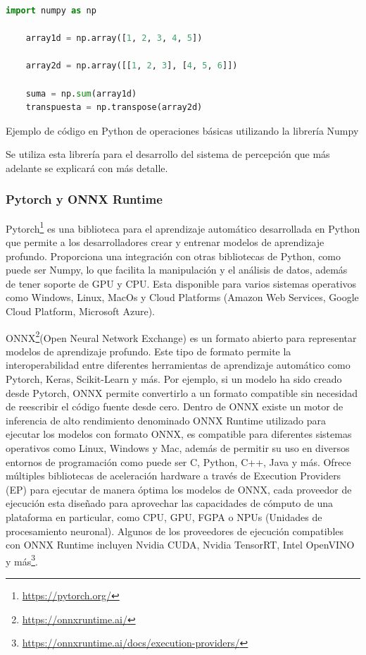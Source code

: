\begin{code}[h]
  \begin{lstlisting}[language=Python]
    import numpy as np

    array1d = np.array([1, 2, 3, 4, 5])

    array2d = np.array([[1, 2, 3], [4, 5, 6]])

    suma = np.sum(array1d)  
    transpuesta = np.transpose(array2d)  
  \end{lstlisting}
  \caption[Ejemplo de código en Python de operaciones básicas utilizando la librería Numpy]{Ejemplo de código en Python de operaciones básicas utilizando la librería Numpy}
  \label{cod:Numpy}
  \end{code}  

Se utiliza esta librería para el desarrollo del sistema de percepción que más adelante se explicará con más detalle. 

\subsubsection{Pytorch y ONNX Runtime}
\label{sec:pytorchandonnx}
Pytorch\footnote{\url{https://pytorch.org/}} es una biblioteca para el aprendizaje automático desarrollada en Python que permite a 
los desarrolladores crear y entrenar modelos de aprendizaje profundo. Proporciona una integración con otras bibliotecas de Python, como puede ser
Numpy, lo que facilita la manipulación y el análisis de datos, además de tener soporte de GPU y CPU. Esta disponible para varios sistemas operativos 
como Windows, Linux, MacOs y Cloud Platforms (Amazon Web Services, Google Cloud Platform, Microsoft Azure).

ONNX\footnote{\url{https://onnxruntime.ai/}}(Open Neural Network Exchange) es un formato abierto para representar modelos de aprendizaje profundo. Este tipo de formato 
permite la interoperabilidad entre diferentes herramientas de aprendizaje automático como Pytorch, Keras, Scikit-Learn y más. Por ejemplo, si un modelo ha sido creado desde Pytorch, 
ONNX permite convertirlo 
a un formato compatible sin necesidad de reescribir el código fuente desde cero. Dentro de ONNX existe un motor de inferencia de alto rendimiento denominado ONNX Runtime utilizado 
para ejecutar los modelos con formato ONNX, es compatible para diferentes sistemas operativos como Linux, Windows y Mac, además de permitir su uso en diversos entornos de programación
como puede ser C, Python, C++, Java y más. Ofrece múltiples bibliotecas de aceleración hardware a través de Execution Providers (EP) para ejecutar de manera óptima los modelos de ONNX, cada proveedor de ejecución
esta diseñado para aprovechar las capacidades de cómputo de una plataforma en particular, como CPU, GPU, FGPA o NPUs (Unidades de procesamiento neuronal).
Algunos de los proveedores de ejecución compatibles con ONNX Runtime incluyen Nvidia CUDA, Nvidia TensorRT, Intel OpenVINO y más\footnote{\url{https://onnxruntime.ai/docs/execution-providers/}}. 

